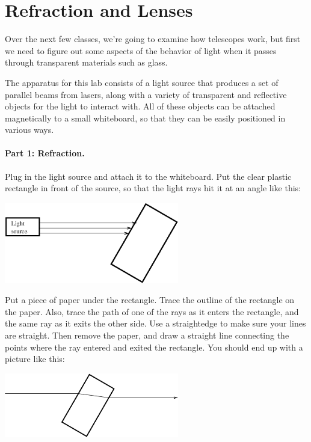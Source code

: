 \section{Refraction and Lenses}

Over the next few classes, we're going to examine how telescopes work,
but first we need to figure out some aspects of the behavior of light
when it passes through transparent materials such as glass.

The apparatus for this lab consists of a light source that produces a set
of parallel beams from lasers, along with a variety of transparent and
reflective objects for the light to interact with.  All of these objects
can be attached magnetically to a small whiteboard, so that they can be
easily positioned in various ways.

\paragraph{Part 1: Refraction.}
Plug in the light source and attach it to the whiteboard.  Put
the clear plastic rectangle in front of the source, so that
the light rays hit it at an angle like this:

\answerspace{0.1in}
\centerline{\includegraphics[width=3in]{lenses1/lensfig1.eps}}


Put a piece of paper under the rectangle.  Trace the outline of the rectangle
on the paper.  Also, trace the path of one of the rays as it enters
the rectangle, and the same ray as it exits the other side.  Use
a straightedge to make sure your lines are straight.
Then remove the paper, and draw a straight line connecting the points
where the ray entered and exited the rectangle. 
You should end up
with a picture like this:

\answerspace{0.1in}
\centerline{\includegraphics[width=3in]{lenses1/lensfig2.eps}}



